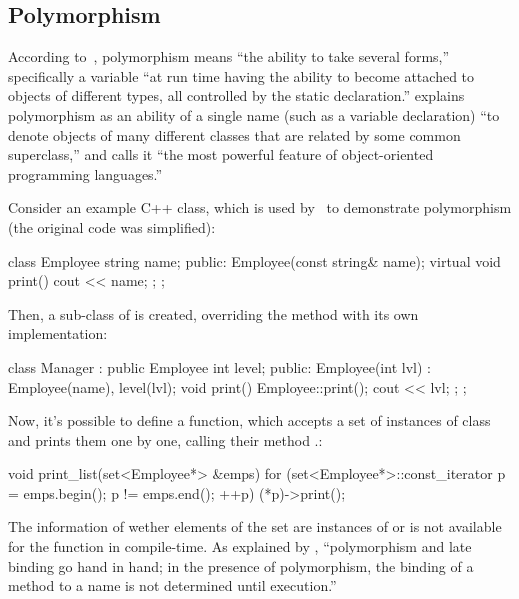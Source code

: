 \subsection{Polymorphism}

According to~\citet[p.467]{meyer1997object}, polymorphism means
``the ability to take several forms,'' specifically a variable
``at run time having the ability to become attached to objects
of different types, all controlled by the static declaration.''
\citet[p.67]{grady2007object} explains polymorphism as
an ability of a single name (such as a variable declaration)
``to denote objects of many different classes that are related by some common superclass,''
and calls it ``the most powerful feature of object-oriented programming languages.''

Consider an example C++ class, which is used by~\citet[p.310]{stroustrup1997}
to demonstrate polymorphism (the original code was simplified):

\begin{ffcode}
class Employee {
  string name;
public:
  Employee(const string& name);
  virtual void print() { cout << name; };
};
\end{ffcode}

Then, a sub-class of  is created, overriding
the method  with its own implementation:

\begin{ffcode}
class Manager : public Employee {
  int level;
public:
  Employee(int lvl) :
    Employee(name), level(lvl);
  void print() {
    Employee::print();
    cout << lvl;
  };
};
\end{ffcode}

Now, it's possible to define a function, which accepts a set
of instances of class  and prints them one by one,
calling their method .:

\begin{ffcode}
void print_list(set<Employee*> &emps) {
  for (set<Employee*>::const_iterator p =
    emps.begin(); p != emps.end(); ++p) {
    (*p)->print();
  }
}
\end{ffcode}

The information of wether elements of the set  are instances of 
or  is not available for the  function in compile-time.
As explained by \citet[p.103]{grady2007object},
``polymorphism and late binding go hand in hand;
in the presence of polymorphism, the binding of a method
to a name is not determined until execution.''

